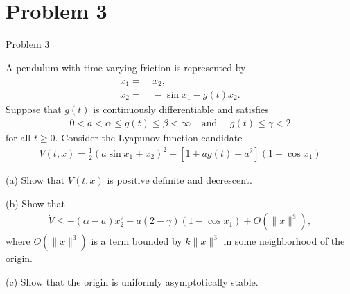 \documentclass[8pt]{beamer}
\let\tempone\itemize
\let\temptwo\enditemize
\newenvironment{proitemize}{\vspace{-1em}\tempone}{\temptwo}%
\begin{document}
\section{Problem 3}
\begin{frame}[t]{Problem 3}
  \begin{block}{}
  A pendulum with time-varying friction is represented by
\begin{align*}
\dot x_1=&~x_2,\\
\dot x_2=&~-\sin x_1-g(t)x_2.
\end{align*}
Suppose that $g(t)$ is continuously differentiable and satisfies
\begin{align*}
0<a<\alpha\leq g(t)\leq \beta<\infty ~~~~~\mbox{and}~~~~~~\dot g(t)\leq \gamma<2
\end{align*}
for all $t\geq 0$. Consider the Lyapunov function candidate
\begin{align*}
V(t,x)=\frac{1}{2}(a\sin x_1+x_2)^2+[1+ag(t)-a^2](1-\cos x_1)
\end{align*}
\begin{proitemize}
\item[(a)] Show that $V(t,x)$ is positive definite and decrescent.

\item[(b)]
Show that
\begin{align*}
\dot V\leq-(\alpha-a)x_2^2-a(2-\gamma)(1-\cos x_1)+O(\|x\|^3),
\end{align*}
where $O(\|x\|^3)$ is a term bounded by $k\|x\|^3$ in some neighborhood of the origin.

\item[(c)] Show that the origin is uniformly asymptotically stable.
\end{proitemize}
\end{block}
\end{frame}
\end{document}
